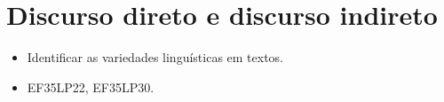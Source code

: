 \chapter{Discurso direto e discurso indireto}


\begin{itemize}
  \item Identificar as variedades linguísticas em textos.
\end{itemize}


\begin{itemize}
  \item EF35LP22, EF35LP30.
\end{itemize}

